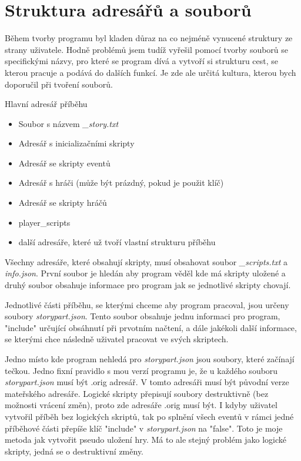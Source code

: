 \documentclass[12pt,a4paper]{article}
\begin{document}
\section{Struktura adresářů a souborů}
Během tvorby programu byl kladen důraz na co nejméně vynucené struktury ze strany uživatele. Hodně problémů jsem tudíž vyřešil pomocí tvorby souborů se specifickými názvy, pro které se program dívá a vytvoří si strukturu cest, se kterou pracuje a podává do dalších funkcí. Je zde ale určitá kultura, kterou bych doporučil při tvoření souborů.

Hlavní adresář příběhu
\begin{itemize}
	\item Soubor s názvem \textit{\_story.txt}
	\item Adresář s inicializačními skripty
	\item Adresář se skripty eventů
	\item Adresář s hráči (může být prázdný, pokud je použit klíč)
	\item Adresář se skripty hráčů 
	\item player\_scripts
	\item další adresáře, které už tvoří vlastní strukturu příběhu
\end{itemize}

Všechny adresáře, které obsahují skripty, musí obsahovat soubor \textit{\_scripts.txt} a \textit{info.json}. První soubor je hledán aby program věděl kde má skripty uložené a druhý soubor obsahuje informace pro program jak se jednotlivé skripty chovají.

Jednotlivé části příběhu, se kterými chceme aby program pracoval, jsou určeny soubory \textit{storypart.json}. Tento soubor obsahuje jednu informaci pro program, "include" určující obsáhnutí při prvotním načtení, a dále jakékoli další informace, se kterými chce následně uživatel pracovat ve svých skriptech.

Jedno místo kde program nehledá pro \textit{storypart.json} jsou soubory, které začínají tečkou. Jedno fixní pravidlo s mou verzí programu je, že u každého souboru \textit{storypart.json} musí být .orig adresář. V tomto adresáři musí být původní verze mateřského adresáře. Logické skripty přepisují soubory destruktivně (bez možnosti vrácení změn), proto zde adresáře .orig musí být. I kdyby uživatel vytvořil příběh bez logických skriptů, tak po splnění všech eventů v rámci jedné příběhové části přepíše klíč "include" v \textit{storypart.json} na "false". Toto je moje metoda jak vytvořit pseudo uložení hry. Má to ale stejný problém jako logické skripty, jedná se o destruktivní změny.
\end{document}
